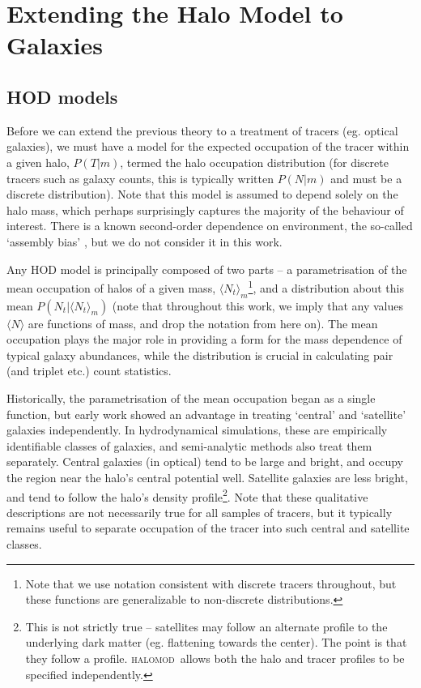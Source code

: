 \documentclass[5p,aas_macros]{elsarticle}
\newcommand{\Nt}{\langle N_t \rangle}
\newcommand{\halomod}{\textsc{halomod}}
\begin{document}
\section{Extending the Halo Model to Galaxies}
\label{sec:TracerHaloModel}

\subsection{HOD models}
\label{sec:theory-gal:hod}
Before we can extend the previous theory to a treatment of tracers (eg. optical galaxies), we must have a model for the expected occupation of the tracer within a given halo, $P(T|m)$, termed the halo occupation distribution (for discrete tracers such as galaxy counts, this is typically written $P(N|m)$ and must be a discrete distribution). Note that this model is assumed to depend solely on the halo mass, which perhaps surprisingly captures the majority of the behaviour of interest. There is a known second-order dependence on environment, the so-called `assembly bias' \citep{Sunayama2015}, but we do not consider it in this work.

Any HOD model is principally composed of two parts -- a parametrisation of the mean occupation of halos of a given mass, $\Nt_m$\footnote{Note that we use notation consistent with discrete tracers throughout, but these functions are generalizable to non-discrete distributions.}, and a distribution about this mean $P(N_t|\Nt_m)$ (note that throughout this work, we imply that any values $\langle N \rangle$ are functions of mass, and drop the notation from here on). The mean occupation plays the major role in providing a form for the mass dependence of typical galaxy abundances, while the distribution is crucial in calculating pair (and triplet etc.) count statistics. 

Historically, the parametrisation of the mean occupation began as a single function, but early work \citep{Kauffmann2004,Zheng2005,Zehavi2005} showed an advantage in treating `central' and `satellite' galaxies independently. In hydrodynamical simulations, these are empirically identifiable classes of galaxies, and semi-analytic methods also treat them separately. Central galaxies (in optical) tend to be large and bright, and occupy the region near the halo's central potential well. Satellite galaxies are less bright, and tend to follow the halo's density profile\footnote{This is not strictly true -- satellites may follow an alternate profile to the underlying dark matter (eg. flattening towards the center). The point is that they follow a profile. \halomod\ allows both the halo and tracer profiles to be specified independently.}.  Note that these qualitative descriptions are not necessarily true for all samples of tracers, but it typically remains useful to separate occupation of the tracer into such central and satellite classes.
\end{document}
